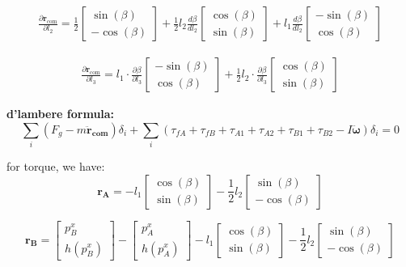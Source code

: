 \documentclass[10pt]{article}
\begin{document}
\begin{align*}
\frac{\partial \mathbf{r}_{\mathrm{com}}}{\partial l_2} =
\frac{1}{2}
\begin{bmatrix}
\sin(\beta) \\
-\cos(\beta)
\end{bmatrix}
+
\frac{1}{2} l_2 \frac{d\beta}{d l_2}
\begin{bmatrix}
\cos(\beta) \\
\sin(\beta)
\end{bmatrix}
+
l_1\frac{d\beta}{d l_2}
\begin{bmatrix}
- \sin(\beta) \\
\cos(\beta)
\end{bmatrix}
\end{align*}

\begin{align*}
\frac{\partial \mathbf{r}_{\mathrm{com}}}{\partial l_3} =
l_1 \cdot \frac{\partial \beta}{\partial l_3}
\begin{bmatrix}
- \sin(\beta) \\
\cos(\beta)
\end{bmatrix}
+
\frac{1}{2} l_2 \cdot \frac{\partial \beta}{\partial l_3}
\begin{bmatrix}
\cos(\beta) \\
\sin(\beta)
\end{bmatrix}
\end{align*}

\textbf{d'lambere formula: }
\[
\sum_i (F_g - m \mathbf{\ddot{r}_{com}})\delta_i 
+ \sum_i (\tau_{fA} + \tau_{fB} + \tau_{A1} + \tau_{A2} + \tau_{B1} + \tau_{B2} 
- I \mathbf{\ddot{\omega}})\delta_i = 0
\]

for torque, we have:
\[
\mathbf{r_{A}} = 
-
l_1
\begin{bmatrix}
\cos(\beta) \\
\sin(\beta)
\end{bmatrix}
-
\frac{1}{2} l_2
\begin{bmatrix}
\sin(\beta) \\
-\cos(\beta)
\end{bmatrix}
\]

\[
\mathbf{r_{B}} = 
\begin{bmatrix}
p_B^x \\
h(p_B^x)
\end{bmatrix}
-
\begin{bmatrix}
p_A^x \\
h(p_A^x)
\end{bmatrix}
-
l_1
\begin{bmatrix}
\cos(\beta) \\
\sin(\beta)
\end{bmatrix}
-
\frac{1}{2} l_2
\begin{bmatrix}
\sin(\beta) \\
-\cos(\beta)
\end{bmatrix}
\]
\end{document}
